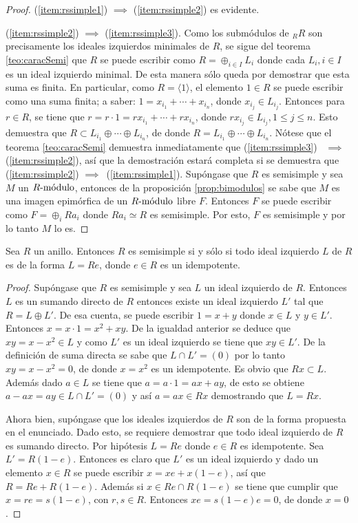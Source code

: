 \begin{proof}
(\ref{item:rssimple1}) $\implies$ (\ref{item:rssimple2}) es evidente.

(\ref{item:rssimple2}) $\implies$ (\ref{item:rssimple3}). Como los submódulos de $_RR$ son precisamente los ideales izquierdos minimales de $R$, se sigue del teorema \ref{teo:caracSemi} que $R$ se puede escribir como $R = \oplus_{i \in I}L_i$ donde cada $L_i, i \in I$ es un ideal izquierdo minimal. De esta manera sólo queda por demostrar que esta suma es finita.
En particular, como $R = \langle 1 \rangle$, el elemento $1 \in R$ se puede escribir como una suma finita; a saber: $1 = x_{i_1} + \cdots + x_{i_n}$, donde $x_{i_j} \in L_{i_j}$. Entonces para $r \in R$, se tiene que $r = r \cdot 1 = rx_{i_1} + \cdots +rx_{i_n}$, donde $rx_{i_j} \in L_{i_j}, 1\leq j \leq n$. Esto demuestra que $R \subset L_{i_1} \oplus \cdots \oplus L_{i_n}$, de donde $R = L_{i_1} \oplus \cdots \oplus L_{i_n}$.
Nótese que el teorema \ref{teo:caracSemi} demuestra inmediatamente que (\ref{item:rssimple3})~ $\implies$(\ref{item:rssimple2}), así que la demostración estará completa si se demuestra que (\ref{item:rssimple2}) $\implies$~(\ref{item:rssimple1}). 
Supóngase que $R$ es semisimple y sea $M$ un $\modulo{R}$, entonces de la proposición \ref{prop:bimodulos} se sabe que $M$ es una imagen epimórfica de un $\modulo{R}$ libre $F$. Entonces $F$ se puede escribir como $F = \oplus_{i}Ra_i$ donde $Ra_i \simeq R$ es semisimple. Por esto, $F$ es semisimple y por lo tanto $M$ lo es. 
\end{proof}
\begin{teorema}\label{teo:idealIdem}
Sea $R$ un anillo. Entonces $R$ es semisimple si y sólo si todo ideal izquierdo $L$ de $R$ es de la forma $L = Re$, donde $e \in R$ es un idempotente.
\end{teorema}
\begin{proof}
Supóngase que $R$ es semisimple y sea $L$ un ideal  izquierdo de $R$. Entonces $L$ es un sumando directo de $R$ entonces existe un ideal izquierdo $L'$ tal que $R = L \oplus L'$. De esa cuenta, se puede escribir $1 = x + y$ donde $x \in L$ y $y \in L'$. Entonces $x = x \cdot 1 = x^2 + xy$. De la igualdad anterior se deduce que $xy = x - x^2 \in L$ y como $L'$ es un ideal izquierdo se tiene que $xy \in L'$. De la definición de suma directa se sabe que $L \cap L' = (0)$ por lo tanto $xy = x - x^2 = 0$, de donde $x = x^2$ es un idempotente. Es obvio que $Rx \subset L$. Además dado $a  \in L$ se tiene que $a = a \cdot 1 = ax + ay$, de esto se obtiene $a -ax = ay\in L\cap L'=(0)$ y así $a = ax \in Rx$ demostrando que $L = Rx$. 

Ahora bien, supóngase que los ideales izquierdos de $R$ son de la forma propuesta en el enunciado. Dado esto, se requiere demostrar que todo ideal izquierdo de $R$ es sumando directo. Por hipótesis $L = Re$ donde $e \in R$ es idempotente. Sea $L'= R(1-e)$. Entonces es claro que $L'$ es un ideal izquierdo y dado un elemento $x \in R$ se puede escribir $x = xe + x(1-e)$, así que $R = Re + R(1-e)$. Además si $x \in Re \cap R(1-e)$ se tiene que cumplir que $x = re = s(1-e)$, con $r,s \in R$. Entonces $xe = s(1-e)e = 0$, de donde $x = 0$.  
\end{proof}
